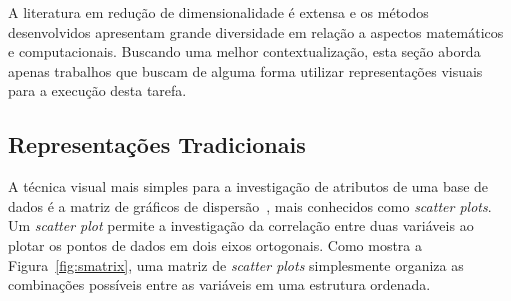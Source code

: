 
A literatura em redução de dimensionalidade é extensa e os métodos desenvolvidos apresentam grande diversidade em relação a aspectos matemáticos e computacionais. Buscando uma melhor contextualização, esta seção aborda apenas trabalhos que buscam de alguma forma utilizar representações visuais para a execução desta tarefa.

\subsection{Representações Tradicionais}


A técnica visual mais simples para a investigação de atributos de uma base de dados é a matriz de gráficos de dispersão~\cite{Becker1987}, mais conhecidos como \textit{scatter plots}. Um \textit{scatter plot} permite a investigação da correlação entre duas variáveis ao plotar os pontos de dados em dois eixos ortogonais. Como mostra a Figura~\ref{fig:smatrix}, uma matriz de \textit{scatter plots} simplesmente organiza as combinações possíveis entre as variáveis em uma estrutura ordenada. 

